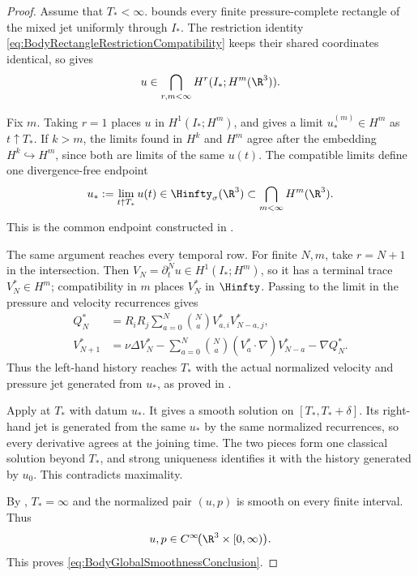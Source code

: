 \begin{proof}
Assume that \(T_*<\infty\).
 bounds every finite
pressure-complete rectangle of the mixed jet uniformly through \(I_*\).
The restriction identity \eqref{eq:BodyRectangleRestrictionCompatibility}
keeps their shared coordinates identical, so
 gives
\[
  u\in\bigcap_{r,m<\infty}H^r(I_*;H^m(\R^3)).
\]

Fix \(m\).
Taking \(r=1\) places \(u\) in \(H^1(I_*;H^m)\), and  gives a limit
\(u_*^{(m)}\in H^m\) as \(t\uparrow T_*\).  If \(k>m\), the limits found in
\(H^k\) and \(H^m\) agree after the embedding \(H^k\hookrightarrow H^m\),
since both are limits of the same \(u(t)\).  The compatible limits define one
divergence-free endpoint
\begin{equation}\label{eq:BodyCommonSmoothEndpoint}
  u_*:=\lim_{t\uparrow T_*}u(t)
  \in\Hinfty_\sigma(\R^3)
  \subset\bigcap_{m<\infty}H^m(\R^3).
\end{equation}
This is the common endpoint constructed in
.

The same argument reaches every temporal row.  For finite \(N,m\), take
\(r=N+1\) in the intersection.  Then
\(V_N=\partial_t^Nu\in H^1(I_*;H^m)\), so it has a terminal trace
\(V_N^*\in H^m\); compatibility in \(m\) places \(V_N^*\) in \(\Hinfty\).
Passing to the limit in the pressure and velocity recurrences gives
\begin{align*}
  Q_N^*
  &=R_iR_j\sum_{a=0}^{N}\binom{N}{a}V_{a,i}^*V_{N-a,j}^*,
  \\
  V_{N+1}^*
  &=\nu\Delta V_N^*
  -\sum_{a=0}^{N}\binom{N}{a}(V_a^*\cdot\nabla)V_{N-a}^*
  -\nabla Q_N^*.
\end{align*}
Thus the left-hand history reaches \(T_*\) with the actual normalized velocity
and pressure jet generated from \(u_*\), as proved in
.

Apply  at \(T_*\) with datum \(u_*\).  It gives a
smooth solution on \([T_*,T_*+\delta]\).  Its right-hand jet is generated from
the same \(u_*\) by the same normalized recurrences, so every derivative agrees
at the joining time.  The two pieces form one classical solution beyond
\(T_*\), and strong uniqueness identifies it with the history generated by
\(u_0\).  This contradicts maximality.

By , \(T_*=\infty\) and the normalized pair \((u,p)\) is smooth on every finite interval.
Thus
\[
  u,p\in C^\infty\!\bigl(\R^3\times[0,\infty)\bigr).
\]
This proves \eqref{eq:BodyGlobalSmoothnessConclusion}.


\end{proof}
